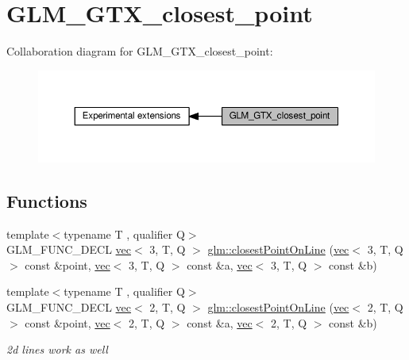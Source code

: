 \hypertarget{group__gtx__closest__point}{}\section{G\+L\+M\+\_\+\+G\+T\+X\+\_\+closest\+\_\+point}
\label{group__gtx__closest__point}
Collaboration diagram for G\+L\+M\+\_\+\+G\+T\+X\+\_\+closest\+\_\+point\+:
\nopagebreak
\begin{figure}[H]
\begin{center}
\leavevmode
\includegraphics[width=350pt]{d4/d36/group__gtx__closest__point}
\end{center}
\end{figure}
\subsection*{Functions}
\begin{DoxyCompactItemize}
\item 
{\footnotesize template$<$typename T , qualifier Q$>$ }\\G\+L\+M\+\_\+\+F\+U\+N\+C\+\_\+\+D\+E\+CL \hyperlink{structglm_1_1vec}{vec}$<$ 3, T, Q $>$ \hyperlink{group__gtx__closest__point_ga36529c278ef716986151d58d151d697d}{glm\+::closest\+Point\+On\+Line} (\hyperlink{structglm_1_1vec}{vec}$<$ 3, T, Q $>$ const \&point, \hyperlink{structglm_1_1vec}{vec}$<$ 3, T, Q $>$ const \&a, \hyperlink{structglm_1_1vec}{vec}$<$ 3, T, Q $>$ const \&b)
\item 
\mbox{\label{group__gtx__closest__point_ga55bcbcc5fc06cb7ff7bc7a6e0e155eb0}} 
{\footnotesize template$<$typename T , qualifier Q$>$ }\\G\+L\+M\+\_\+\+F\+U\+N\+C\+\_\+\+D\+E\+CL \hyperlink{structglm_1_1vec}{vec}$<$ 2, T, Q $>$ \hyperlink{group__gtx__closest__point_ga55bcbcc5fc06cb7ff7bc7a6e0e155eb0}{glm\+::closest\+Point\+On\+Line} (\hyperlink{structglm_1_1vec}{vec}$<$ 2, T, Q $>$ const \&point, \hyperlink{structglm_1_1vec}{vec}$<$ 2, T, Q $>$ const \&a, \hyperlink{structglm_1_1vec}{vec}$<$ 2, T, Q $>$ const \&b)
\begin{DoxyCompactList}\small\item\em 2d lines work as well \end{DoxyCompactList}\end{DoxyCompactItemize}


